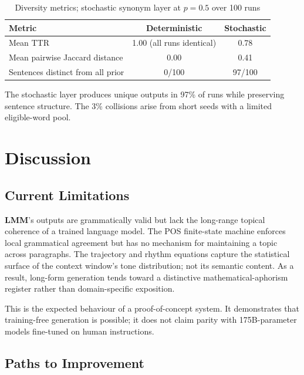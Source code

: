 \documentclass[11pt,a4paper]{article}
\newcommand{\lmm}{\texorpdfstring{%
  \textbf{\color{lmmAccent}LMM}}{LMM}}
\begin{document}
\begin{table}[H]
\centering
\caption{Diversity metrics; stochastic synonym layer at $p=0.5$ over 100 runs}
\label{tab:diversity}
\renewcommand{\arraystretch}{1.3}
\begin{tabular}{@{}lcc@{}}
\toprule
\rowcolor{lmmHeaderBg}
{\color{white}\textbf{Metric}} &
{\color{white}\textbf{Deterministic}} &
{\color{white}\textbf{Stochastic}} \\
\midrule
\rowcolor{white}     Mean TTR                          & 1.00 (all runs identical) & 0.78 \\
\rowcolor{lmmRowAlt} Mean pairwise Jaccard distance    & 0.00                      & 0.41 \\
\rowcolor{white}     Sentences distinct from all prior & 0/100                     & 97/100 \\
\bottomrule
\end{tabular}
\end{table}

The stochastic layer produces unique outputs in 97\% of runs while preserving sentence structure. The 3\% collisions arise from short seeds with a limited eligible-word pool.

\section{Discussion}
\label{sec:discussion}

\subsection{Current Limitations}

\lmm{}'s outputs are grammatically valid but lack the long-range topical coherence of a trained language model. The POS finite-state machine enforces local grammatical agreement but has no mechanism for maintaining a topic across paragraphs. The trajectory and rhythm equations capture the statistical surface of the context window's tone distribution; not its semantic content. As a result, long-form generation tends toward a distinctive mathematical-aphorism register rather than domain-specific exposition.

This is the expected behaviour of a proof-of-concept system. It demonstrates that training-free generation is possible; it does not claim parity with 175B-parameter models fine-tuned on human instructions.

\subsection{Paths to Improvement}
\end{document}
